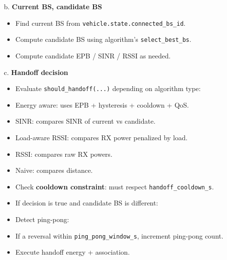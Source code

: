 \documentclass[conference]{IEEEtran}
\begin{document}
       b. \textbf{Current BS, candidate BS}
\begin{itemize}
\item Find current BS from \texttt{vehicle.state.connected\_bs\_id}.
\item Compute candidate BS using algorithm’s \texttt{select\_best\_bs}.
\item Compute candidate EPB / SINR / RSSI as needed.
\end{itemize}

       c. \textbf{Handoff decision}
\begin{itemize}
\item Evaluate \texttt{should\_handoff(...)} depending on algorithm type:
\item Energy aware: uses EPB + hysteresis + cooldown + QoS.
\item SINR: compares SINR of current vs candidate.
\item Load-aware RSSI: compares RX power penalized by load.
\item RSSI: compares raw RX powers.
\item Naive: compares distance.
\item Check \textbf{cooldown constraint}: must respect \texttt{handoff\_cooldown\_s}.
\item If decision is true and candidate BS is different:
\item Detect ping-pong:
\item If a reversal within \texttt{ping\_pong\_window\_s}, increment ping-pong count.
\item Execute handoff energy + association.
\end{itemize}
\end{document}
